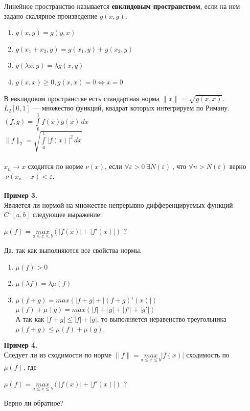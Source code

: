\begin{definition}
    Линейное пространство называется \textbf{евклидовым пространством}, если на нем задано скалярное произведение $g(x, y)$:\begin{enumerate}
        \item $g(x, y) = g(y, x)$
        \item $g(x_1+x_2, y) = g(x_1, y)+g(x_2, y)$
        \item $g(\lambda x, y) = \lambda g(x, y)$
        \item $g(x, x) \geqslant 0, g(x, x) = 0 \Leftrightarrow x = 0$
    \end{enumerate}
\end{definition}
В евклидовом пространстве есть стандартная норма $\parallel x \parallel = \sqrt{g(x, x)}$. 
$L_2[0, 1]$ --- множество функций, квадрат которых интегрируем по Риману.\\
$(f, g) = \int\limits_0^1 f(x) \overline{g(x)}\,dx$\\
$\parallel f \parallel_2 = \sqrt{\int\limits_0^1 |f(x)|^2\,dx}$\\
\\
$x_n \to x$ $\textbf{сходится по норме}$ $\nu(x)$, если $\forall \varepsilon > 0 ~ \exists N(\varepsilon)~$, что $\forall n > N(\varepsilon)$ верно $~\nu(x_n - x) < \varepsilon$.\\ \\
\textbf{Пример 3.}\\
Является ли нормой на множестве непрерывно дифференцируемых функций $C^1[a, b]$ следующее выражение: \begin{center}$\mu(f) = \underset{a \leqslant x \leqslant b}{max}(|f(x)|+|f'(x)|)$ ?\end{center}
Да, так как выполняются все свойства нормы.\begin{enumerate}
    \item $\mu(f) > 0$
    \item $\mu(\lambda f) = \lambda \mu(f)$
    \item $\mu(f+g) = max(|f+g|+|(f+g)'(x)|)$\\
    $\mu(f)+\mu(g) = max(|f|+|g|+|f'|+|g'|)$\\
    А так как $|f+g|\leqslant |f|+|g|$, то выполняется неравенство треугольника \\$\mu(f+g) \leqslant \mu(f) + \mu(g)$.\end{enumerate}
\textbf{Пример 4.}\\ Следует ли из сходимости по норме $\parallel f \parallel = \underset{a \leqslant x \leqslant b}{max} |f(x)|$ сходимость по $\mu(f)$, где \begin{center}$\mu(f) = \underset{a \leqslant x \leqslant b}{max}(|f(x)|+|f'(x)|)$ ?\end{center} Верно ли обратное?\\ \\
